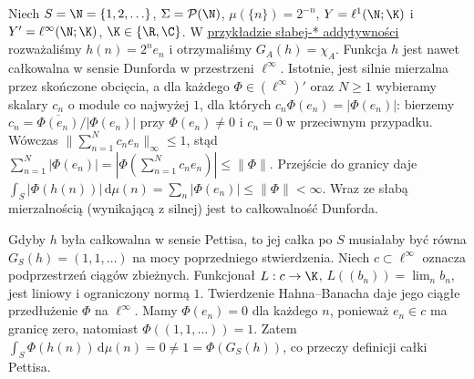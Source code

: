 \begin{przyklad}
\label{ex:gelfand-not-pettis15b}
Niech $S=\N=\{1,2,\ldots\}$, $\Sigma=\mathcal P(\N)$,
$\mu(\{n\})=2^{-n}$, $Y=\ell^1(\N;\K)$ i
$Y'=\ell^\infty(\N;\K)$, $\K\in\{\R,\C\}$.
W \hyperref[ex:gelfand-weakstar15b]{przykładzie słabej-* addytywności}
rozważaliśmy $h(n)=2^ne_n$ i otrzymaliśmy $G_A(h)=\chi_A$.
Funkcja $h$ jest nawet całkowalna w sensie Dunforda
w przestrzeni $\ell^\infty$. Istotnie, jest silnie
mierzalna przez skończone obcięcia, a dla każdego
$\Phi\in(\ell^\infty)'$ oraz $N\ge1$ wybieramy skalary
$c_n$ o module co najwyżej $1$, dla których
$c_n\Phi(e_n)=|\Phi(e_n)|$: bierzemy
$c_n=\overline{\Phi(e_n)}/|\Phi(e_n)|$ przy
$\Phi(e_n)\ne0$ i $c_n=0$ w przeciwnym przypadku.
Wówczas
$\|\sum_{n=1}^Nc_ne_n\|_\infty\le1$, stąd
$\sum_{n=1}^N|\Phi(e_n)|
=|\Phi(\sum_{n=1}^Nc_ne_n)|\le\|\Phi\|$. Przejście do granicy
daje $\int_S|\Phi(h(n))|\,\mathrm d\mu(n)
=\sum_n|\Phi(e_n)|\le\|\Phi\|<\infty$.
Wraz ze słabą mierzalnością (wynikającą z silnej)
jest to całkowalność Dunforda.

Gdyby $h$ była całkowalna w sensie Pettisa, to jej
całka po $S$ musiałaby być równa $G_S(h)=(1,1,\ldots)$
na mocy poprzedniego stwierdzenia. Niech $c\subset\ell^\infty$
oznacza podprzestrzeń ciągów zbieżnych. Funkcjonał
$L:c\to\K$, $L((b_n))=\lim_n b_n$, jest liniowy
i ograniczony normą $1$. Twierdzenie Hahna--Banacha
daje jego ciągłe przedłużenie $\Phi$ na $\ell^\infty$.
Mamy $\Phi(e_n)=0$ dla każdego $n$, ponieważ
$e_n\in c$ ma granicę zero, natomiast
$\Phi((1,1,\ldots))=1$. Zatem
$\int_S\Phi(h(n))\,\mathrm d\mu(n)=0\ne1
=\Phi(G_S(h))$, co przeczy definicji całki Pettisa.
\end{przyklad}

